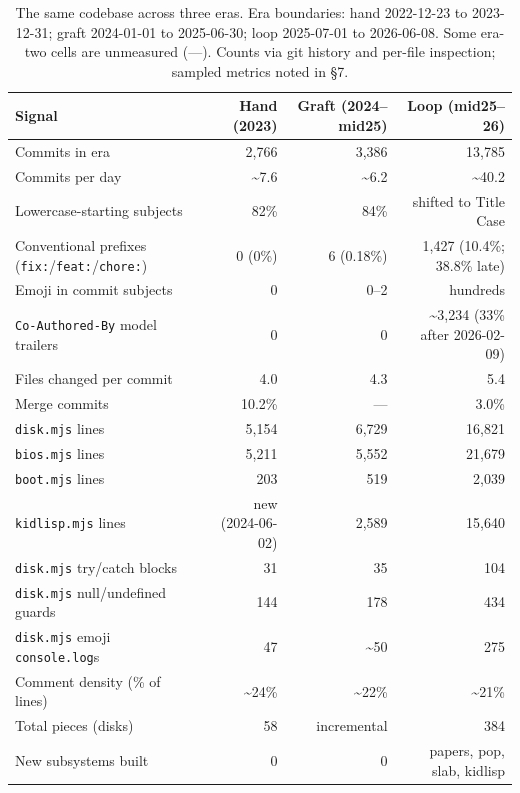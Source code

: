 \documentclass[10pt,letterpaper,twocolumn]{article}
\begin{document}
\begin{table}[t]
\footnotesize
\centering
\begin{tabularx}{\textwidth}{Xrrr}
\toprule
\textbf{Signal} & \textbf{Hand (2023)} & \textbf{Graft (2024--mid25)} & \textbf{Loop (mid25--26)} \\
\midrule
Commits in era & 2,766 & 3,386 & 13,785 \\
Commits per day & \textasciitilde7.6 & \textasciitilde6.2 & \textasciitilde40.2 \\
Lowercase-starting subjects & 82\% & 84\% & shifted to Title Case \\
Conventional prefixes (\texttt{fix:}/\texttt{feat:}/\texttt{chore:}) & 0 (0\%) & 6 (0.18\%) & 1,427 (10.4\%; 38.8\% late) \\
Emoji in commit subjects & 0 & 0--2 & hundreds \\
\texttt{Co-Authored-By} model trailers & 0 & 0 & \textasciitilde3,234 (33\% after 2026-02-09) \\
Files changed per commit & 4.0 & 4.3 & 5.4 \\
Merge commits & 10.2\% & --- & 3.0\% \\
\midrule
\texttt{disk.mjs} lines & 5,154 & 6,729 & 16,821 \\
\texttt{bios.mjs} lines & 5,211 & 5,552 & 21,679 \\
\texttt{boot.mjs} lines & 203 & 519 & 2,039 \\
\texttt{kidlisp.mjs} lines & new (2024-06-02) & 2,589 & 15,640 \\
\texttt{disk.mjs} try/catch blocks & 31 & 35 & 104 \\
\texttt{disk.mjs} null/undefined guards & 144 & 178 & 434 \\
\texttt{disk.mjs} emoji \texttt{console.log}s & 47 & \textasciitilde50 & 275 \\
Comment density (\% of lines) & \textasciitilde24\% & \textasciitilde22\% & \textasciitilde21\% \\
Total pieces (disks) & 58 & incremental & 384 \\
New subsystems built & 0 & 0 & papers, pop, slab, kidlisp \\
\bottomrule
\end{tabularx}
\caption{The same codebase across three eras. Era boundaries: hand 2022-12-23 to 2023-12-31; graft 2024-01-01 to 2025-06-30; loop 2025-07-01 to 2026-06-08. Some era-two cells are unmeasured (---). Counts via git history and per-file inspection; sampled metrics noted in \S7.}
\end{table}
\end{document}

